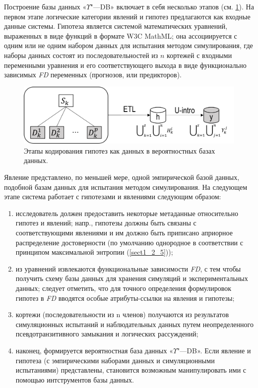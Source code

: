 Построение базы данных «$\Upsilon$"---DB» включает в себя несколько этапов (см. \cref{fig:Upsilon_db_pipeline}). 
На первом этапе логические категории явлений и гипотез предлагаются как входные данные системы. Гипотеза является 
системой математических уравнений, выраженных в виде функций в формате W3C MathML; она ассоциируется с одним или не 
одним набором данных для испытания методом симулирования, где наборы данных состоят из последовательностей из $n$ 
кортежей с входными переменными уравнения и его соответствующего выхода в виде функционально зависимых \textit{FD} 
переменных (прогнозов, или предикторов). 

\begin{figure}[ht]
    \centering
    \includegraphics[width=0.7\linewidth]{images/Upsilon_db_pipeline.pdf}
    \caption{Этапы кодирования гипотез как данных в вероятностных базах данных.}\label{fig:Upsilon_db_pipeline}
\end{figure}

Явление представлено, по меньшей мере, одной эмпирической базой данных, подобной базам данных для испытания методом 
симулирования. На следующем этапе система работает с гипотезами и явлениями следующим образом: 
\begin{enumerate}
    \item исследователь должен предоставить некоторые метаданные относительно гипотез и явлений; напр., гипотезы должны 
            быть связаны с соответствующими явлениями и им должно быть приписано априорное распределение достоверности 
            (по умолчанию однородное в соответствии с принципом максимальной энтропии (\cref{sect1_2_5}));
    \item из уравнений извлекаются функциональные зависимости \textit{FD}, с тем чтобы получить схему базы данных для 
            хранения симуляций и экспериментальных данных; следует отметить, что для точного определения формулировок 
            гипотез в \textit{FD} вводятся особые атрибуты-ссылки на явления и гипотезы; 
    \item кортежи (последовательности из n членов) получаются из результатов симуляционных испытаний и наблюдательных 
            данных путем неопределенного псевдотранзитивного замыкания и логических рассуждений;
    \item наконец, формируется вероятностная база данных «$\Upsilon$"---DB». Если явление и гипотеза 
            (с эмпирическими наборами данных и симуляционными испытаниями) представлены, становится возможным 
            манипулировать ими с помощью интструментов базы данных.
\end{enumerate}

